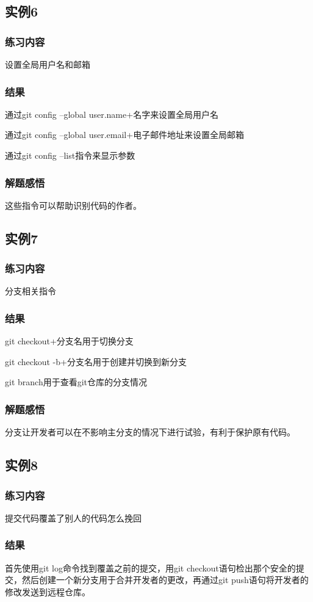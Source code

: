 \documentclass{ctexart}
\begin{document}
\subsection{实例6}
\subsubsection{练习内容}
设置全局用户名和邮箱‌
\subsubsection{结果}
通过git config --global user.name+名字来设置全局用户名

通过git config --global user.email+电子邮件地址来设置全局邮箱

通过git config --list指令来显示参数
\subsubsection{解题感悟}
这些指令可以帮助识别代码的作者。
\subsection{实例7}
\subsubsection{练习内容}
分支相关指令
\subsubsection{结果}
git checkout+分支名用于切换分支

git checkout -b+分支名用于创建并切换到新分支

git branch用于查看git仓库的分支情况
\subsubsection{解题感悟}
分支让开发者可以在不影响主分支的情况下进行试验，有利于保护原有代码。
\subsection{实例8}
\subsubsection{练习内容}
提交代码覆盖了别人的代码怎么挽回
\subsubsection{结果}
首先使用git log命令找到覆盖之前的提交，用git checkout语句检出那个安全的提交，然后创建一个新分支用于合并开发者的更改，再通过git push语句将开发者的修改发送到远程仓库。
\end{document}
